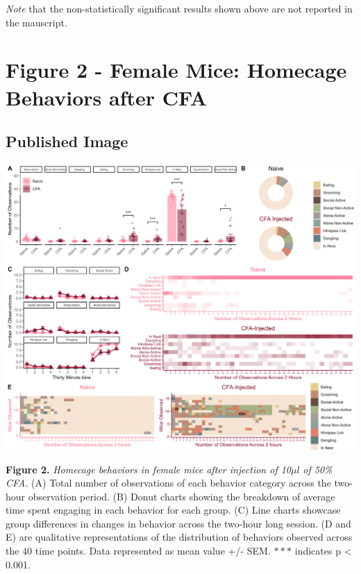 \documentclass[
]{book}
\begin{document}
\emph{Note} that the non-statistically significant results shown above are not reported in the mauscript.

\hypertarget{figure-2---female-mice-homecage-behaviors-after-cfa}{%
\chapter*{Figure 2 - Female Mice: Homecage Behaviors after CFA}\label{figure-2---female-mice-homecage-behaviors-after-cfa}}

\hypertarget{published-image-1}{%
\section*{Published Image}\label{published-image-1}}

\includegraphics[width=45.83in]{Figs/2_female_HC_panel}

\textbf{Figure 2.} \emph{Homecage behaviors in female mice after injection of 10}\(\mu l\) \emph{of 50\% CFA.} (A) Total number of observations of each behavior category across the two-hour observation period. (B) Donut charts showing the breakdown of average time spent engaging in each behavior for each group. (C) Line charts showcase group differences in changes in behavior across the two-hour long session. (D and E) are qualitative representations of the distribution of behaviors observed across the 40 time points. Data represented as mean value +/- SEM. \(***\) indicates p \textless{} 0.001.
\end{document}
